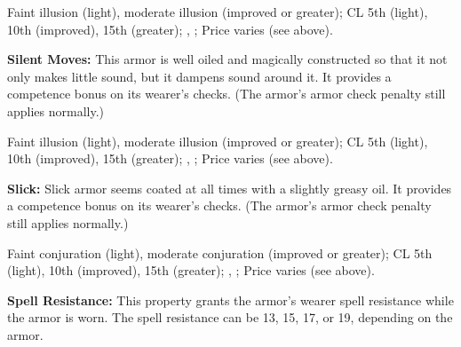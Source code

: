 
Faint illusion (light), moderate illusion (improved or greater); CL 5th (light), 10th (improved), 15th (greater); , ; Price varies (see above).

\textbf{Silent Moves:} This armor is well oiled and magically constructed so that it not only makes little sound, but it dampens sound around it. It provides a competence bonus on its wearer's  checks. (The armor's armor check penalty still applies normally.)


Faint illusion (light), moderate illusion (improved or greater); CL 5th (light), 10th (improved), 15th (greater); , ; Price varies (see above).

\textbf{Slick:} Slick armor seems coated at all times with a slightly greasy oil. It provides a competence bonus on its wearer's  checks. (The armor's armor check penalty still applies normally.)


Faint conjuration (light), moderate conjuration (improved or greater); CL 5th (light), 10th (improved), 15th (greater); , ; Price varies (see above).

\textbf{Spell Resistance:} This property grants the armor's wearer spell resistance while the armor is worn. The spell resistance can be 13, 15, 17, or 19, depending on the armor.

